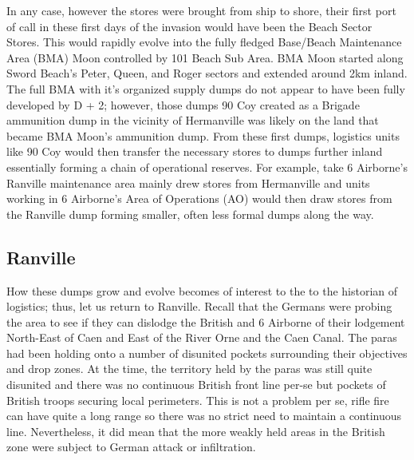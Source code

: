\documentclass[noraggedright]{turabian-researchpaper}
\begin{document}
In any case, however the stores were brought from ship to shore, their first
port of call in these first days of the invasion would have been the Beach 
Sector Stores.  This would rapidly evolve into the fully fledged Base/Beach
Maintenance Area (BMA) Moon controlled by 101 Beach Sub Area.\autocite[See
traces in Neptune No. 1 RAF Beach Squadron Operation Order found in][]
{1raf}  BMA Moon started along Sword Beach's Peter, Queen, and Roger
sectors and extended around 2km inland.  The full BMA with it's organized
supply dumps do not appear to have been fully developed by D + 2; however,
those dumps 90 Coy created as a Brigade ammunition dump in the vicinity of
Hermanville was likely on the land that became BMA Moon's ammunition 
dump.\autocite[Trace of BMA Moon
annexed to Neptune RAF Beach Squadron Operation Order found in]
[Legend entry 67]{1raf}   From these first dumps, logistics units like 90 Coy
would then transfer the necessary stores to dumps further inland essentially
forming a chain of operational reserves.  For example, take 6 Airborne's 
Ranville maintenance area mainly drew stores from Hermanville and units 
working in 6 Airborne's Area of Operations (AO) would then draw stores from
the Ranville dump forming smaller, often less formal dumps along the way.

\subsection{Ranville}





How these dumps grow and evolve becomes of interest to the to the historian
of logistics; thus, let us return to Ranville.  Recall that the Germans were
probing the area to see if they can dislodge the British and 6 Airborne of 
their lodgement North-East of Caen and East of the River Orne
and the Caen Canal. The paras had been holding onto a number of disunited
pockets surrounding their objectives and drop zones.  At the time, the 
territory held by the paras was still quite disunited and there was no
continuous British front line per-se but pockets of British troops securing
local perimeters.  This is not a problem per se, rifle fire can have quite a
long range so there was no strict need to maintain a continuous line.  
Nevertheless, it did mean that the more weakly held areas in the British 
zone were subject to German attack or infiltration.  
\end{document}
